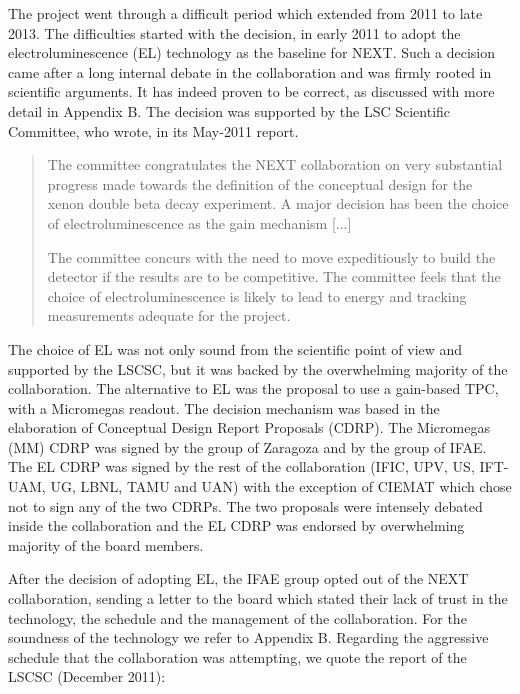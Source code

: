 The project went through a difficult period which extended from 2011 to late 2013. The difficulties started with the decision, in early 2011 to adopt the electroluminescence (EL) technology as the baseline for NEXT. Such a decision came after a long internal debate in the collaboration and was firmly rooted in scientific arguments. It has indeed proven to be correct, as discussed with more detail in Appendix B. The decision was supported by the LSC Scientific Committee, who wrote, in its May-2011 report.

\begin{quotation}
The committee congratulates the NEXT collaboration on very substantial progress made towards the definition of the conceptual design for the xenon double beta decay experiment. A major decision has been the choice of electroluminescence as the gain mechanism [...]

The committee concurs with the need to move expeditiously to build the detector if the results are to be competitive. The committee feels that the choice of electroluminescence is likely to lead to energy and tracking measurements adequate for the project.
\end{quotation}
 
The choice of EL was not only sound from the scientific point of view and supported by the LSCSC, but it was backed by the overwhelming majority of the collaboration. The alternative to EL was the proposal to use a gain-based TPC, with a Micromegas readout. 
%
The decision mechanism was based in the elaboration of Conceptual Design Report Proposals (CDRP). 
The Micromegas (MM) CDRP was signed by the group of Zaragoza and by the group of IFAE. The EL CDRP was signed by the rest of the collaboration (IFIC, UPV, US, IFT-UAM, UG, LBNL, TAMU and UAN) with the exception of CIEMAT which chose not to sign any of the two CDRPs. The two proposals were intensely debated inside the collaboration and the EL CDRP was endorsed by overwhelming majority of the board members. 

After the decision of adopting EL, the IFAE group opted out of the NEXT collaboration, sending a letter to the board which stated their lack of trust in the technology, the schedule and the management of the collaboration. For the soundness of the technology we refer to Appendix B. Regarding the aggressive schedule that the collaboration was attempting, we quote the report of the LSCSC (December 2011):

